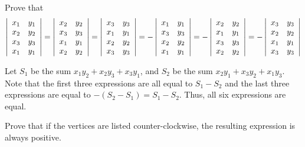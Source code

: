 \documentclass[11pt]{article}
\begin{document}
\begin{problem} \normalfont Prove that
\[\left|\begin{array}{c c} x_1 &  y_1 \\ x_2  & y_2 \\ x_3  & y_3 \\ x_1 & y_1 \\ \end{array}\right| = 
\left|\begin{array}{c c} x_2  & y_2 \\ x_3  & y_3 \\ x_1 &  y_1 \\ x_2 & y_2 \\ \end{array}\right| = 
\left|\begin{array}{c c} x_3  & y_3 \\ x_1 &  y_1 \\ x_2  & y_2 \\ x_3 & y_3 \\ \end{array}\right| = 
-\left|\begin{array}{c c}x_1 &  y_1 \\ x_3  & y_3 \\ x_2  & y_2 \\ x_1 & y_1 \\ \end{array}\right| = 
-\left|\begin{array}{c c} x_2  & y_2 \\ x_1  & y_1 \\ x_3 &  y_3 \\ x_2 & y_2 \\ \end{array}\right| = 
-\left|\begin{array}{c c} x_3  & y_3 \\ x_2 &  y_2 \\ x_1  & y_1 \\ x_3 & y_3 \\ \end{array}\right|\]
\end{problem}

\begin{solution}
Let $S_1$ be the sum $x_1y_2 + x_2y_3 + x_3y_1$, and $S_2$ be the sum $x_2y_1 + x_3y_2 + x_1y_3$.
Note that the first three expressions are all equal to $S_1-S_2$ and the last three expressions are equal to $-(S_2-S_1) = S_1-S_2$. Thus, all six expressions are equal.
\end{solution}
\phantom{hello its me}
\begin{problem}
Prove that if the vertices are listed counter-clockwise, the resulting expression is always positive.
\end{problem}
\end{document}
